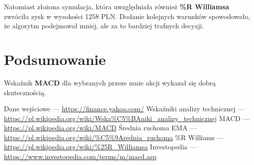 \documentclass{article}
\begin{document}
    Natomiast złożona symulacja, która uwzględniała również \textbf{\%R Williamsa} 
    zwróciła zysk w wysokości 1258 PLN. Dodanie kolejnych warunków spowodowało, że
    algorytm podejmował mniej, ale za to bardziej trafnych decyzji.

    \section{Podsumowanie}
    Wskaźnik \textbf{MACD} dla wybranych przeze mnie akcji wykazał się dobrą skutecznością.

    \renewcommand{\refname}{Źródła}
    \begin{thebibliography}{100}
     Dane wejściowe --- \url{https://finance.yahoo.com/}
     Wskaźniki analizy technicznej --- \url{https://pl.wikipedia.org/wiki/Wska%C5%BAniki_analizy_technicznej}
     MACD --- \url{https://pl.wikipedia.org/wiki/MACD}
     Średnia ruchoma EMA --- \url{https://pl.wikipedia.org/wiki/%C5%9Arednia_ruchoma}
     \%R Williams --- \url{https://pl.wikipedia.org/wiki/%25R_Williamsa}
    \bibitem{} Investopedia --- \url{https://www.investopedia.com/terms/m/macd.asp}

    \end{thebibliography}
\end{document}
